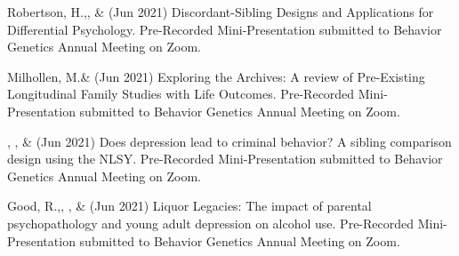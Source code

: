 
\item Robertson, H.,\noteA \Joe, \&  \meb (Jun 2021) Discordant-Sibling Designs and Applications for Differential Psychology. Pre-Recorded Mini-Presentation submitted to Behavior Genetics Annual Meeting on Zoom.

\item Milhollen, M.\noteA \&  \meb (Jun 2021) Exploring the Archives: A review of Pre-Existing Longitudinal Family Studies with Life Outcomes. Pre-Recorded Mini-Presentation submitted to Behavior Genetics Annual Meeting on Zoom.

\item \emsims, \jt,  \&  \meb (Jun 2021) Does depression lead to criminal behavior? A sibling comparison design using the NLSY. Pre-Recorded Mini-Presentation submitted to Behavior Genetics Annual Meeting on Zoom.

\item Good, R.,\noteA, \yrh, \&  \meb (Jun 2021) Liquor Legacies: The impact of parental psychopathology and young adult depression on alcohol use. Pre-Recorded Mini-Presentation submitted to Behavior Genetics Annual Meeting on Zoom.

